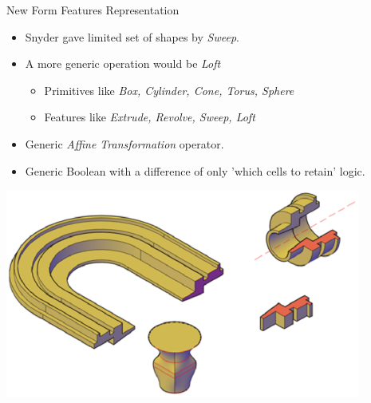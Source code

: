 \newcommand{\loft}[5]{\ensuremath{\textcolor{magenta}{\Omega{\bf \mathcal{L}}_{#1}^{#2,#3}}[\textcolor{blue}{\{#4\}}\textcolor{red}{(#5)}]}}

\newcommand{\affine}[5]{\ensuremath{\textcolor{magenta}{\Delta{\bf \mathcal{A}}_{#1}^{#2,#3}} [\textcolor{blue}{\{#4\}} \textcolor{red}{(#5)}]}}

\newcommand{\boolop}[5]{\ensuremath{\textcolor{magenta}{\Omega{\bf \mathcal{B}}_{#1}^{#2,#3}}[\textcolor{blue}{\{#4\}} \textcolor{red}{(#5)}]}}

\newcommand{\generic}[7]{\ensuremath{\textcolor{magenta}{#1{\bf \mathcal{#2}}_{#3}^{#4,#5}}[\textcolor{blue}{\{#6\}} \textcolor{red}{(#7)}]}}



\begin{frame}{New Form Features Representation}

\begin{itemize}[noitemsep,label=\textbullet,topsep=2pt,parsep=2pt,partopsep=2pt]
\item Snyder \cite{Snyder1992} gave limited set of shapes by {\em Sweep}. 
\item A more generic operation would be {\em Loft}
	\begin{itemize}[noitemsep,label=\textbullet,topsep=2pt,parsep=2pt,partopsep=2pt]
	\item Primitives like {\em Box, Cylinder, Cone, Torus, Sphere} 
	\item Features like {\em Extrude, Revolve, Sweep, Loft}
	\end{itemize}
\item Generic {\em Affine Transformation} operator. 
\item Generic Boolean with a difference of only  'which cells to retain' logic.
\end{itemize}
\begin{center}\includegraphics[width=0.5\linewidth]{../Common/images/SweptVolumes}\end{center}
\end{frame}


